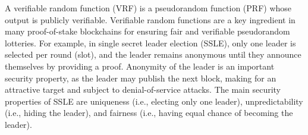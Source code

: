 %
%
A verifiable random function (VRF) is a pseudorandom function (PRF) whose output is publicly verifiable.
Verifiable random functions are a key ingredient in many proof-of-stake blockchains for ensuring fair and verifiable pseudorandom lotteries.
For example, in single secret leader election (SSLE), only one leader is selected per round (slot), and the
leader remains anonymous until they announce themselves by providing a proof.
Anonymity of the leader is an important security property, as the leader may publish the next block, making for an attractive target and subject to denial-of-service attacks.
The main security properties of SSLE are uniqueness (i.e., electing only one leader), unpredictability (i.e., hiding the leader), and fairness (i.e., having equal chance of becoming the leader).


